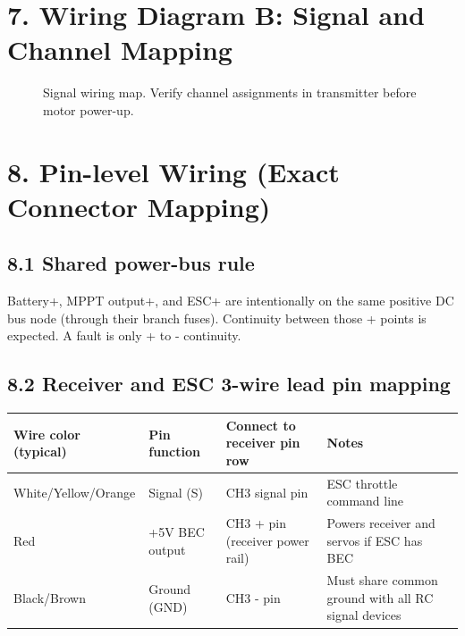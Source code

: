 \documentclass[11pt]{article}
\begin{document}
\section*{7. Wiring Diagram B: Signal and Channel Mapping}
\begin{figure}[H]
\centering
{}
\caption{Signal wiring map. Verify channel assignments in transmitter before motor power-up.}
\end{figure}

\section*{8. Pin-level Wiring (Exact Connector Mapping)}
\subsection*{8.1 Shared power-bus rule}
Battery+, MPPT output+, and ESC+ are intentionally on the same positive DC bus node (through their branch fuses). Continuity between those + points is expected. A fault is only + to - continuity.

\subsection*{8.2 Receiver and ESC 3-wire lead pin mapping}
{\small
\begin{longtable}{>{\raggedright\arraybackslash}p{3.2cm} >{\raggedright\arraybackslash}p{2.0cm} >{\raggedright\arraybackslash}p{3.5cm} >{\raggedright\arraybackslash}p{3.5cm}}
\toprule
Wire color (typical) & Pin function & Connect to receiver pin row & Notes \\
\midrule
\endhead
White/Yellow/Orange & Signal (S) & CH3 signal pin & ESC throttle command line \\
Red & +5V BEC output & CH3 + pin (receiver power rail) & Powers receiver and servos if ESC has BEC \\
Black/Brown & Ground (GND) & CH3 - pin & Must share common ground with all RC signal devices \\
\bottomrule
\end{longtable}
}
\end{document}
